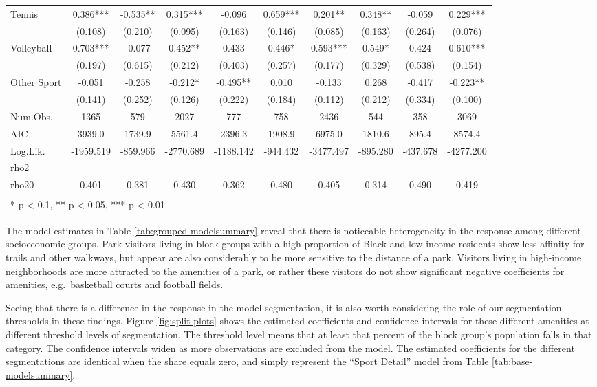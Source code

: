 \documentclass[]{elsarticle} %
\begin{document}
\begin{table}
\begin{tabular}[t]{lccccccccc}
Tennis & 0.386*** & -0.535** & 0.315*** & -0.096 & 0.659*** & 0.201** & 0.348** & -0.059 & 0.229***\\
 & (0.108) & (0.210) & (0.095) & (0.163) & (0.146) & (0.085) & (0.163) & (0.264) & (0.076)\\
Volleyball & 0.703*** & -0.077 & 0.452** & 0.433 & 0.446* & 0.593*** & 0.549* & 0.424 & 0.610***\\
 & (0.197) & (0.615) & (0.212) & (0.403) & (0.257) & (0.177) & (0.329) & (0.538) & (0.154)\\
Other Sport & -0.051 & -0.258 & -0.212* & -0.495** & 0.010 & -0.133 & 0.268 & -0.417 & -0.223**\\
 & (0.141) & (0.252) & (0.126) & (0.222) & (0.184) & (0.112) & (0.212) & (0.334) & (0.100)\\
\midrule
Num.Obs. & 1365 & 579 & 2027 & 777 & 758 & 2436 & 544 & 358 & 3069\\
AIC & 3939.0 & 1739.9 & 5561.4 & 2396.3 & 1908.9 & 6975.0 & 1810.6 & 895.4 & 8574.4\\
Log.Lik. & -1959.519 & -859.966 & -2770.689 & -1188.142 & -944.432 & -3477.497 & -895.280 & -437.678 & -4277.200\\
rho2 &  &  &  &  &  &  &  &  & \\
rho20 & 0.401 & 0.381 & 0.430 & 0.362 & 0.480 & 0.405 & 0.314 & 0.490 & 0.419\\
\bottomrule
\multicolumn{10}{l}{\textsuperscript{} * p < 0.1, ** p < 0.05, *** p < 0.01}\\
\end{tabular}
\end{table}

The model estimates in Table \ref{tab:grouped-modelsummary} reveal that there
is noticeable heterogeneity in the response among different socioeconomic
groups. Park visitors living in block groups with a high proportion of Black and
low-income residents show less affinity for trails and other walkways, but
appear are also considerably to be more sensitive to the distance of a park.
Visitors living in high-income neighborhoods are more attracted to the amenities
of a park, or rather these visitors do not show significant negative
coefficients for amenities, e.g.~basketball courts and football fields.

Seeing that there is a difference in the response in the model segmentation,
it is also worth considering the role of our segmentation thresholds in these
findings. Figure \ref{fig:split-plots} shows the estimated coefficients and
confidence intervals for these different amenities at different threshold levels
of segmentation. The threshold level means that at least that percent
of the block group's population falls in that category. The confidence intervals
widen as more observations are excluded from the model. The estimated coefficients
for the different segmentations are identical when the share equals zero, and
simply represent the ``Sport Detail'' model from Table \ref{tab:base-modelsummary}.
\end{document}
